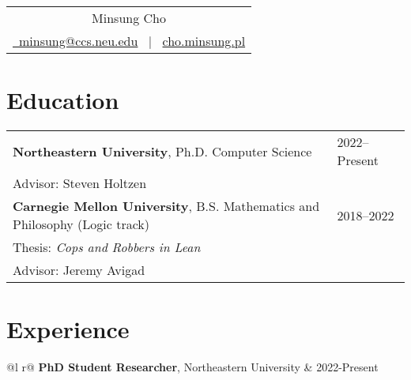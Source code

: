 \documentclass[12pt]{article}
\begin{document}
\pagestyle{empty} 



\begin{tabularx}{\linewidth}{@{} C @{}}
\Huge{Minsung Cho} \\[7.5pt]
\href{mailto:minsung@ccs.neu.edu}{\raisebox{-0.05\height}\ minsung@ccs.neu.edu} \ $|$ \ \href{cho.minsung.pl}{cho.minsung.pl} 
\end{tabularx}

\section{Education}
\begin{tabularx}{\linewidth}{@{}l X@{}}	
\textbf{Northeastern University}, Ph.D. Computer Science & \hfill 2022--Present \\
[3pt]
Advisor: Steven Holtzen\vspace{0.5em}\\
\textbf{Carnegie Mellon University}, B.S. Mathematics and Philosophy (Logic track) & \hfill 2018--2022 \\ 
[3pt]
Thesis: \textit{Cops and Robbers in Lean} \\

Advisor: Jeremy Avigad

\end{tabularx}

\section{Experience}

\begin{tabularx}{\linewidth}{ @{}l r@{} }
  \textbf{PhD Student Researcher}, Northeastern University & \hfill 2022-Present \\[3pt]
  \end{tabularx}
\end{document}
